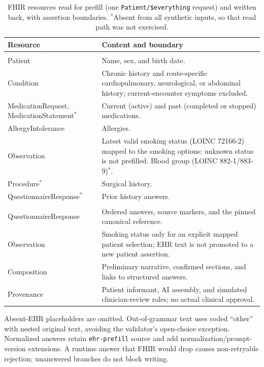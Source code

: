 \begin{table}[t]\centering\small
\caption{FHIR resources read for prefill (one \texttt{Patient/\$everything} request)
and written back, with assertion boundaries. $^\ast$Absent from all synthetic inputs,
so that read path was not exercised.}\label{tab:fhir}
\begin{tabular}{>{\raggedright\arraybackslash}p{3.4cm}p{8.1cm}}\hline
Resource & Content and boundary \\\hline
\multicolumn{2}{l}{\emph{Read for prefill}} \\
Patient & Name, sex, and birth date. \\
Condition & Chronic history and route-specific cardiopulmonary, neurological, or abdominal history; current-encounter symptoms excluded. \\
MedicationRequest, MedicationStatement$^\ast$ & Current (active) and past (completed or stopped) medications. \\
AllergyIntolerance & Allergies. \\
Observation & Latest valid smoking status (LOINC 72166-2) mapped to the smoking options; unknown status is not prefilled. Blood group (LOINC 882-1/883-9)$^\ast$. \\
Procedure$^\ast$ & Surgical history. \\
Questionnaire\-Response$^\ast$ & Prior history answers. \\\hline
\multicolumn{2}{l}{\emph{Written back}} \\
QuestionnaireResponse & Ordered answers, source markers, and the pinned canonical reference. \\
Observation & Smoking status only for an explicit mapped patient selection; EHR text is not promoted to a new patient assertion. \\
Composition & Preliminary narrative, confirmed sections, and links to structured answers. \\
Provenance & Patient informant, AI assembly, and simulated clinician-review roles; no actual clinical approval. \\\hline
\end{tabular}
\end{table}

Absent-EHR placeholders are omitted. Out-of-grammar text uses coded ``other'' with
nested original text, avoiding the validator's open-choice exception. Normalized
answers retain \texttt{ehr-prefill} source and add normalization/prompt-version
extensions. A runtime answer that FHIR would drop causes non-retryable rejection;
unanswered branches do not block writing.

